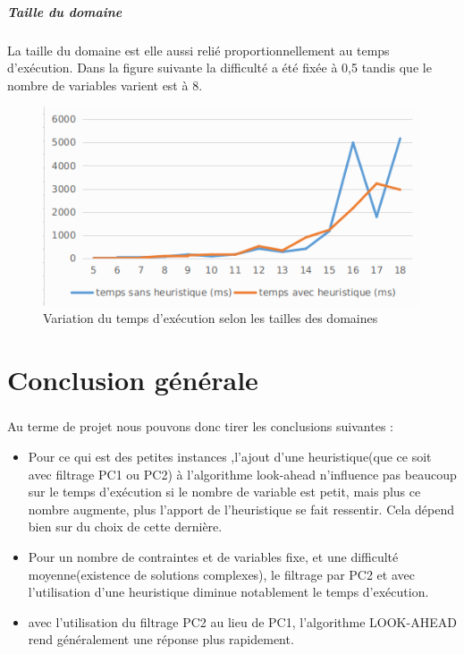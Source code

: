 \documentclass[12pt]{report}
\begin{document}
\paragraph{Taille du domaine}
La taille du domaine est elle aussi relié proportionnellement  au temps d’exécution. Dans la figure suivante la difficulté a été fixée à 0,5 tandis que le nombre de variables varient est à 8.
\begin{figure}[H]
	\centering
	\includegraphics[scale=0.5]{imgs/domain.png}
	\caption{Variation du temps d'exécution selon les tailles des domaines}
	\label{fig:doms}
\end{figure}
\chapter{Conclusion générale}
\paragraph{}
Au terme de projet nous pouvons donc tirer les conclusions suivantes :
\begin{itemize}
	\item Pour ce qui est des petites instances ,l'ajout d'une heuristique(que ce soit avec filtrage PC1 ou PC2) à l'algorithme look-ahead n'influence pas beaucoup sur le temps d'exécution si le nombre de variable est petit, mais plus ce nombre augmente, plus l'apport de l'heuristique se fait ressentir. Cela dépend bien sur du choix de cette dernière.
	
	\item Pour un nombre de contraintes et de variables fixe, et une difficulté moyenne(existence de solutions complexes), le filtrage par PC2 et avec l'utilisation d'une heuristique diminue notablement le temps d'exécution.
	
	\item avec l'utilisation du filtrage PC2 au lieu de PC1, l'algorithme LOOK-AHEAD rend généralement une réponse plus rapidement.
\end{itemize} 
\end{document}
